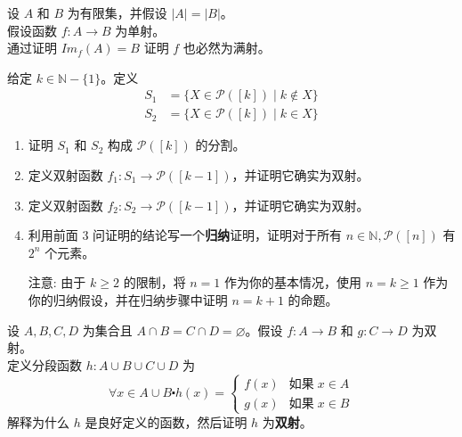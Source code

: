 \begin{exercise}
    设 $A$ 和 $B$ 为有限集，并假设 $|A| = |B|$。\\
    假设函数 $f : A \to B$ 为单射。\\
    通过证明 $Im_f (A) = B$ 证明 $f$ 也必然为满射。
\end{exercise}

\begin{exercise}
    给定 $k \in \mathbb{N} - \{1\}$。定义
    \begin{align*}
        S_1 & = \{X \in \mathcal{P}([k]) \mid k \notin X\} \\
        S_2 & = \{X \in \mathcal{P}([k]) \mid k \in X\}
    \end{align*}
    \begin{enumerate}[label=(\alph*)]
        \item 证明 $S_1$ 和 $S_2$ 构成 $\mathcal{P}([k])$ 的分割。
        \item 定义双射函数 $f_1 : S_1 \to \mathcal{P}([k-1])$，并证明它确实为双射。
        \item 定义双射函数 $f_2 : S_2 \to \mathcal{P}([k-1])$，并证明它确实为双射。
        \item 利用前面 3 问证明的结论写一个\textbf{归纳}证明，证明对于所有 $n \in \mathbb{N}, \mathcal{P}([n])$ 有 $2^n$ 个元素。

              注意: 由于 $k \ge 2$ 的限制，将 $n = 1$ 作为你的基本情况，使用 $n = k \ge 1$ 作为你的归纳假设，并在归纳步骤中证明 $n = k + 1$ 的命题。
    \end{enumerate}\label{exc:exercises7.8.30}
\end{exercise}

\begin{exercise}
    设 $A, B, C, D$ 为集合且 $A \cap B = C \cap D = \varnothing$。假设 $f : A \to B$ 和 $g : C \to D$ 为双射。\\
    定义分段函数 $h : A \cup B \cup C \cup D$ 为
    \[\forall x \in A \cup B \centerdot h(x) = \begin{cases}
            f(x) & \text{如果}\; x \in A \\
            g(x) & \text{如果}\; x \in B
        \end{cases}\]
    解释为什么 $h$ 是良好定义的函数，然后证明 $h$ 为\textbf{双射}。\label{exc:exercises7.8.31}
\end{exercise}

